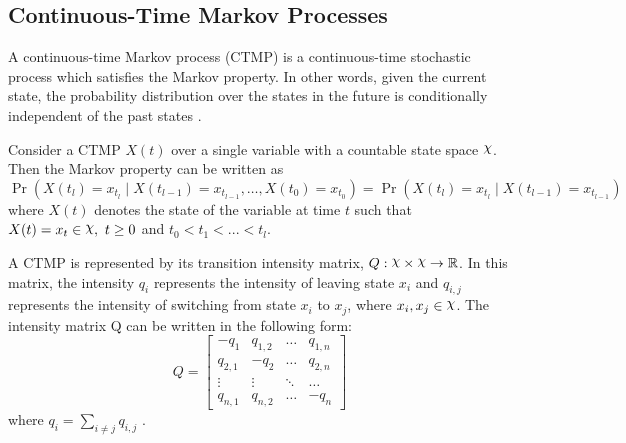 \subsection{Continuous-Time Markov Processes}
A continuous-time Markov process (CTMP) is a continuous-time stochastic process which satisfies the Markov property. In other words, given the current state, the probability distribution over the states in the future is conditionally independent of the past states \cite{Cohn2010a}. \par
Consider a CTMP $ X(t) $ over a single variable with a countable state space $ \rchi $. Then the Markov property can be written as
\begin{equation}
\operatorname{Pr}\left(X(t_{l})=x_{t_{l}} \mid X(t_{l-1})=x_{t_{l-1}}, \ldots, X(t_{0})=x_{t_{0}}\right)=\operatorname{Pr}\left(X(t_{l})=x_{t_{l}} \mid X(t_{l-1})=x_{t_{l-1}}\right)
\end{equation}
where $ X(t) $ denotes the state of the variable at time $ t $ such that $ X(t)=x_t \in \rchi,\ t \geq 0$ and $ t_0<t_1<...<t_l $.\par
A CTMP is represented by its transition intensity matrix, $ Q : \rchi \times \rchi \rightarrow \mathbb{R}$. In this matrix, the intensity $ q_{i} $ represents the intensity of leaving state $ x_{i} $ and $ q_{i,j} $ represents the intensity of switching from state $ x_{i} $ to $ x_{j} $, where $ x_i, x_j \in \rchi $. The intensity matrix Q can be written in the following form:
\begin{equation}
Q = 
\begin{bmatrix}
-q_{1} & q_{1,2} &     {\hdots}  & q_{1,n} \\
q_{2,1} & -q_{2} &     {\hdots}  & q_{2,n}  \\
{\vdots}  &     {\vdots}  &     {\ddots}  & {\hdots}  \\
q_{n,1} &  q_{n,2} &  {\hdots} & -q_{n}
\end{bmatrix}
\label{eq:Q_matrix}
\end{equation}
where $ q_{i} = \sum_{i \neq j} q_{i,j}$ \cite{Nodelman1995}.

